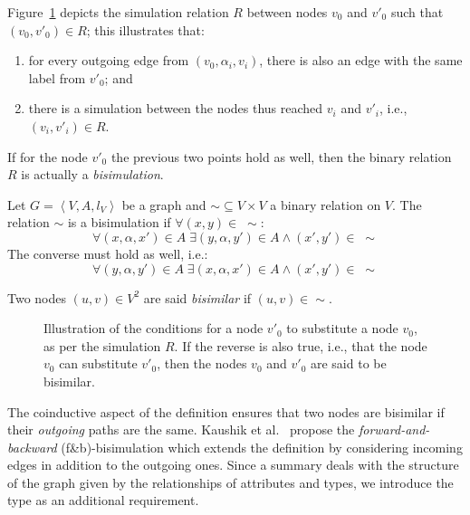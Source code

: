 Figure~\ref{fig:bisimulation} depicts the simulation relation $R$ between nodes $v_0$ and $v'_0$ such that $(v_0, v'_0) \in R$; this illustrates that:
\begin{enumerate}
	\item for every outgoing edge from $(v_0,\alpha_i,v_i)$, there is also an edge with the same label from $v'_0$; and
	\item there is a simulation between the nodes thus reached $v_i$ and $v'_i$, i.e., $(v_i, v'_i) \in R$.
\end{enumerate}
If for the node $v'_0$ the previous two points hold as well, then the binary relation $R$ is actually a \emph{bisimulation}.

\begin{definition}[Bisimulation]
Let $G=\left\langle V, A, l_V \right\rangle$ be a graph and $\sim \subseteq V \times V$ a binary relation on $V$.
The relation $\sim$ is a bisimulation if $\forall (x,y) \in\; \sim$:
\begin{equation*}
\forall (x, \alpha, x') \in A\; \exists (y, \alpha, y') \in A \wedge (x',y') \in\; \sim
\label{eq:b1}
\end{equation*}
The converse must hold as well, i.e.:
\begin{equation*}
\forall (y, \alpha, y') \in A\; \exists (x, \alpha, x') \in A \wedge (x',y') \in\; \sim
\label{eq:b2}
\end{equation*}
\end{definition}

\begin{remark}
Two nodes $(u, v) \in V^2$ are said \emph{bisimilar} if $(u, v) \in \sim$.
\end{remark}

\begin{figure}
	\centering
	\resizebox{.8\textwidth}{!}{
		
	}
	\caption{Illustration of the conditions for a node $v'_0$ to substitute a node $v_0$, as per the simulation $R$. If the reverse is also true, i.e., that the node $v_0$ can substitute $v'_0$, then the nodes $v_0$ and $v'_0$ are said to be bisimilar.}
	\label{fig:bisimulation}
\end{figure}

The coinductive aspect of the definition ensures that two nodes are bisimilar if their \emph{outgoing} paths are the same. Kaushik et al.~\cite{kaushik:2002:cib} propose the \emph{forward-and-backward} (f\&b)-bisimulation which extends the definition by considering incoming edges in addition to the outgoing ones. Since a summary deals with the structure of the graph given by the relationships of attributes and types, we introduce the type as an additional requirement.

